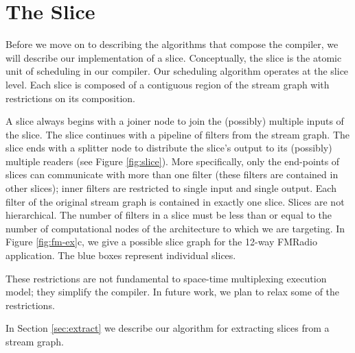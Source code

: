 \section{The Slice}
Before we move on to describing the algorithms that compose the
compiler, we will describe our implementation of a
slice. Conceptually, the slice is the atomic unit of scheduling in our
compiler.  Our scheduling algorithm operates at the slice level.
Each slice is composed of a contiguous region of the stream
graph with restrictions on its composition. 

A slice always begins with a joiner node to join the (possibly)
multiple inputs of the slice.  The slice continues with a pipeline of
filters from the stream graph.  The slice ends with a splitter node to
distribute the slice's output to its (possibly) multiple readers (see
Figure \ref{fig:slice}).  More specifically, only the end-points of
slices can communicate with more than one filter (these filters are
contained in other slices); inner filters are restricted to single
input and single output.  Each filter of the original stream graph is
contained in exactly one slice.  Slices are not hierarchical.  The
number of filters in a slice must be less than or equal to the number
of computational nodes of the architecture to which we are targeting.
In Figure \ref{fig:fm-ex}c, we give a possible slice graph for the
12-way FMRadio application.  The blue boxes represent individual
slices.

These restrictions are not fundamental to space-time multiplexing
execution model; they simplify the compiler.  In future work, we plan
to relax some of the restrictions.

In Section \ref{sec:extract} we describe our algorithm for extracting
slices from a stream graph.


